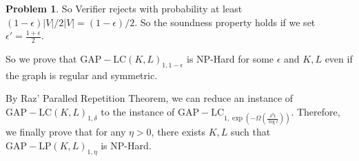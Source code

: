 \documentclass[a4paper]{article}
\theoremstyle{definition}
\newtheorem{problem}{Problem}
\theoremstyle{plain}
\newcommand{\<}{\left<}
\renewcommand{\>}{\right>}
\numberwithin{equation}{problem}
\begin{document}
\begin{problem}
    So Verifier rejects with probability at least  $ (1-\epsilon)|V|/2|V|=(1-\epsilon)/2 $. So the soundness property holds if we set  $ \epsilon'=\frac{1+\epsilon}{2} $.
    
    So we prove that  $ \mathrm{GAP-LC}(K,L)_{1,1-\epsilon} $ is NP-Hard for some  $ \epsilon $  and  $ K,L $ even if the graph is regular and symmetric.
    
    By Raz' Paralled Repetition Theorem, we can reduce an instance of  $ \mathrm{GAP-LC}(K,L)_{1,\delta} $ to the instance of  $ \mathrm{GAP-LC}_{1,\exp(-\Omega(\frac{\delta^3t}{\log t}))} $. Therefore, we finally prove that for any  $ \eta>0 $, there exists  $ K,L $ such that  $ \mathrm{GAP-LP}(K,L)_{1,\eta} $ is NP-Hard.
        
\end{problem}
\end{document}
